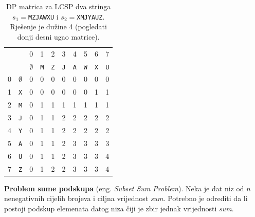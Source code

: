      \begin{table}
     	  \centering
     	  \begin{tabular}{cc|cccccccc}
     	  	& & 0&1 &2 &3 &4 &5 &6 &7   \\
     	  
     	  	& & $\emptyset$&\texttt{M} &\texttt{Z} &\texttt{J} &\texttt{A} &\texttt{W} &\texttt{X} &\texttt{U}  \\ \hline \hline
     	  	
     	  	0&$\emptyset$ &0& 0& 0&  0&0 &0 & 0   & 0 	   \\
     	  	1& \texttt{X}& 0& 0& 0& 0& 0& 0&  1  & 1                \\	
     	  	2& \texttt{M}& 0& 1& 1& 1& 1& 1&  1  & 1                \\	
     	  	3& \texttt{J}& 0& 1& 1& 2& 2& 2&  2  & 2                \\	
     	  	4& \texttt{Y}&0 & 1& 1& 2& 2& 2&  2  & 2                 \\	
      	  	5& \texttt{A}& 0& 1& 1& 2& 3& 3&  3  & 3                \\	
      	  	6& \texttt{U}& 0& 1& 1& 2& 3& 3&  3  & 4                \\	
      	  	7& \texttt{Z}& 0& 1& 2& 2& 3& 3&  3  & 4                \\	 \hline \hline
     	  \end{tabular}
 	 \caption{DP matrica za LCSP dva stringa $s_1=$\texttt{MZJAWXU} i $s_2=$\texttt{XMJYAUZ}. Rješenje je dužine 4 (pogledati donji desni ugao matrice). }  \label{tab:dp-lcs-example} 
 	\end{table}



\begin{example} \textbf{Problem sume podskupa} (eng. \emph{Subset Sum Problem}). Neka je dat niz od $n$ nenegativnih cijelih brojeva i ciljna vrijednost \textit{sum}. Potrebno je odrediti da li postoji podskup elemenata datog niza čiji je zbir jednak vrijednosti \textit{sum}.
\end{example}

